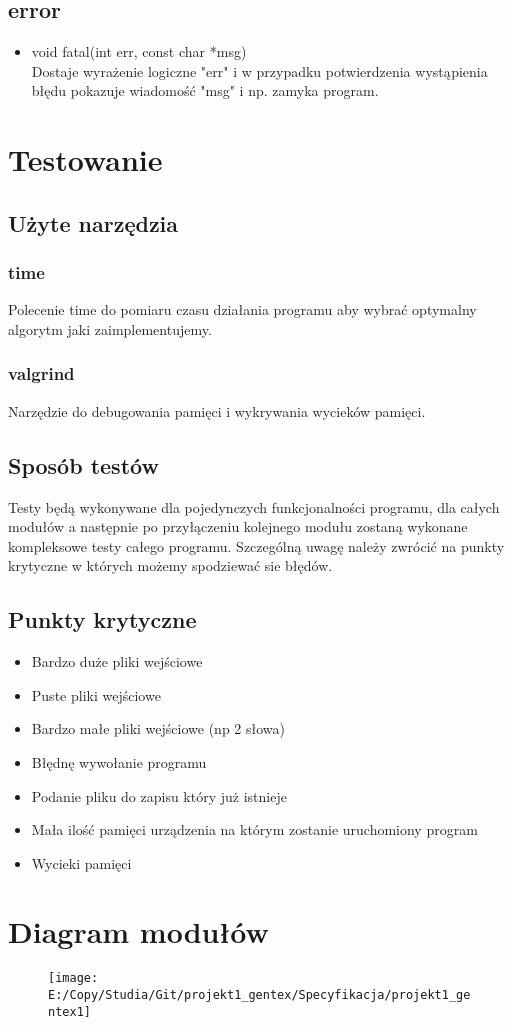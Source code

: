\documentclass[12pt,a4paper]{report}
\begin{document}
	\subsection*{error} 
		\begin{itemize}
			
			\item void fatal(int err, const char *msg)\\
			Dostaje wyrażenie logiczne "err" i w przypadku potwierdzenia wystąpienia błędu pokazuje wiadomość "msg" i np. zamyka program.
		\end{itemize}

\section*{Testowanie}

	\subsection*{Użyte narzędzia}
	
		\subsubsection*{time} Polecenie time do pomiaru czasu działania programu aby wybrać optymalny algorytm jaki zaimplementujemy.
		
		\subsubsection*{valgrind} Narzędzie do debugowania pamięci i wykrywania wycieków pamięci.

	\subsection*{Sposób testów} Testy będą wykonywane dla pojedynczych funkcjonalności programu, dla całych modułów a następnie po przyłączeniu kolejnego modułu zostaną wykonane kompleksowe testy całego programu. Szczególną uwagę należy zwrócić na punkty krytyczne w których możemy spodziewać sie błędów.

	\subsection*{Punkty krytyczne} 
		\begin{itemize}
			
			\item Bardzo duże pliki wejściowe
			\item Puste pliki wejściowe
			\item Bardzo małe pliki wejściowe (np 2 słowa)
			\item Błędnę wywołanie programu
			\item Podanie pliku do zapisu który już istnieje
			\item Mała ilość pamięci urządzenia na którym zostanie uruchomiony program
			\item Wycieki pamięci
			
		\end{itemize}

\section*{Diagram modułów} \begin{figure}
\centering
\texttt{[image: E:/Copy/Studia/Git/projekt1\_gentex/Specyfikacja/projekt1\_gentex1]}
\caption{}
\label{fig:projekt1_gentex1}
\end{figure}
\end{document}
